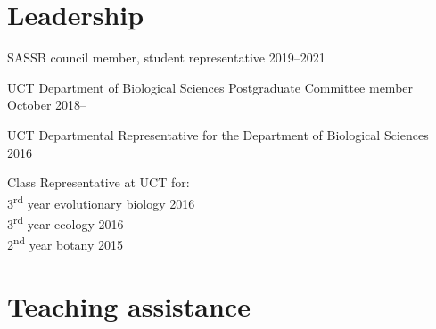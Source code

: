 \documentclass[10pt]{article}
\begin{document}
\hrulefill

\section*{Leadership} %

SASSB council member, student representative                   \hfill 2019--2021

UCT Department of Biological Sciences Postgraduate Committee member
                                                      \hfill October 2018--

UCT Departmental Representative for the Department of Biological Sciences
                                                                     \hfill 2016

Class Representative at UCT for: \\
\hspace{2em} 3\textsuperscript{rd} year evolutionary biology      \hfill 2016 \\
\hspace{2em} 3\textsuperscript{rd} year ecology                   \hfill 2016 \\
\hspace{2em} 2\textsuperscript{nd} year botany                    \hfill 2015 \\

\section*{Teaching assistance} %

\end{document}

